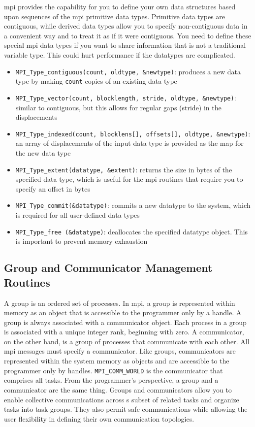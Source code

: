 \documentclass[10pt]{article}
\begin{document}
\begin{flushleft}
\gls{mpi} provides the capability for you to define your own data structures based upon sequences of the \gls{mpi} primitive data types. Primitive data types are contiguous, while derived data types allow you to specify non-contiguous data in a convenient way and to treat it as if it were contiguous. You need to define these special \gls{mpi} data types if you want to share information that is not a traditional variable type. This could hurt performance if the datatypes are complicated. 

\begin{itemize}
\item {\tt MPI\_Type\_contiguous(count, oldtype, \&newtype)}: produces a new data type by making {\tt count} copies of an existing data type
\item {\tt MPI\_Type\_vector(count, blocklength, stride, oldtype, \&newtype)}: similar to contiguous, but this allows for regular gaps (stride) in the displacements
\item {\tt MPI\_Type\_indexed(count, blocklens[], offsets[], oldtype, \&newtype)}: an array of displacements of the input data type is provided as the map for the new data type
\item {\tt MPI\_Type\_extent(datatype, \&extent)}: returns the size in bytes of the specified data type, which is useful for the \gls{mpi} routines that require you to specify an offset in bytes
\item {\tt MPI\_Type\_commit(\&datatype)}: commits a new datatype to the system, which is required for all user-defined data types 
\item {\tt MPI\_Type\_free (\&datatype)}: deallocates the specified datatype object. This is important to prevent memory exhaustion
\end{itemize}

\subsection{Group and Communicator Management Routines}

A group is an ordered set of processes. In \gls{mpi}, a group is represented within memory as an object that is accessible to the programmer only by a handle. A group is always associated with a communicator object. Each process in a group is associated with a unique integer rank, beginning with zero. A communicator, on the other hand, is a group of processes that communicate with each other. All \gls{mpi} messages must specify a communicator. Like groups, communicators are represented within the system memory as objects and are accessible to the programmer only by handles. {\tt MPI\_COMM\_WORLD} is the communicator that comprises all tasks. From the programmer's perspective, a group and a communicator are the same thing. Groups and communicators allow you to enable collective communications across s subset of related tasks and organize tasks into task groups. They also permit safe communications while allowing the user flexibility in defining their own communication topologies. 


\end{flushleft}
\end{document}
